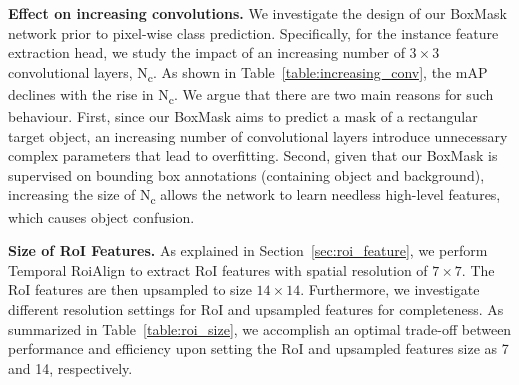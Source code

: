 \documentclass[10pt,twocolumn,letterpaper]{article}
\begin{document}
\vspace{3pt}
\noindent \textbf{Effect on increasing convolutions.}
\label{sec:ablation_num_conv}
We investigate the design of our BoxMask network prior to pixel-wise class prediction. Specifically, for the instance feature extraction head, we study the impact of an increasing number of $3 \times 3$ convolutional layers, N\textsubscript{c}. As shown in Table~\ref{table:increasing_conv}, the mAP declines with the rise in N\textsubscript{c}. We argue that there are two main reasons for such behaviour.
First, since our BoxMask aims to predict a mask of a rectangular target object, an increasing number of convolutional layers introduce unnecessary complex parameters that lead to overfitting. Second, given that our BoxMask is supervised on bounding box annotations (containing object and background), increasing the size of N\textsubscript{c} allows the network to learn needless high-level features, which causes object confusion.


\vspace{3pt}
\noindent \textbf{Size of RoI Features.}
As explained in Section~\ref{sec:roi_feature}, we perform Temporal RoiAlign to extract RoI features with spatial resolution of $ 7 \times 7$. The RoI features are then upsampled to size $14 \times 14$. Furthermore, we investigate different resolution settings for RoI and upsampled features for completeness. As summarized in Table~\ref{table:roi_size}, we accomplish an optimal trade-off between performance and efficiency upon setting the RoI and upsampled features size as 7 and 14, respectively.
\end{document}
